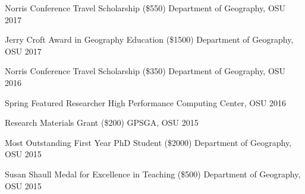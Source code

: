 
\begin{cvhonors}

  \cvhonor
    {Norris Conference Travel Scholarship (\$550)} %
    {} %
    {Department of Geography, OSU} %
    {2017} %

  \cvhonor
    {Jerry Croft Award in Geography Education (\$1500)} %
    {} %
    {Department of Geography, OSU} %
    {2017} %

  \cvhonor
    {Norris Conference Travel Scholarship (\$350)} %
    {} %
    {Department of Geography, OSU} %
    {2016} %

  \cvhonor
    {Spring Featured Researcher}%
    {} %
    {High Performance Computing Center, OSU} %
    {2016} %

  \cvhonor
    {Research Materials Grant (\$200)}%
    {} %
    {GPSGA, OSU} %
    {2015} %

  \cvhonor
    {Most Outstanding First Year PhD Student (\$2000)}%
    {} %
    {Department of Geography, OSU} %
    {2015} %

  \cvhonor
    {Susan Shaull Medal for Excellence in Teaching (\$500)}%
    {} %
    {Department of Geography, OSU} %
    {2015} %


\end{cvhonors}
